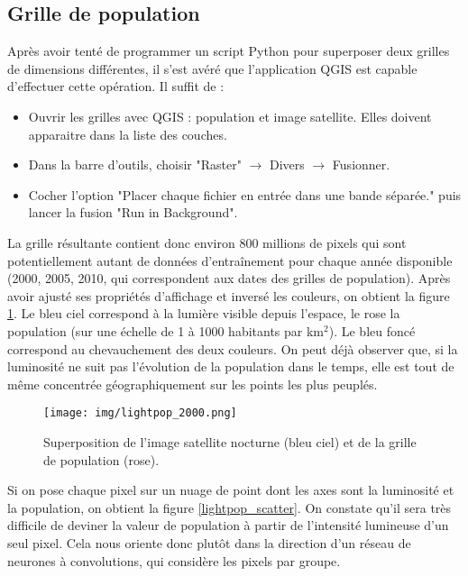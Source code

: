 \documentclass[a4paper, 11pt]{report}
\begin{document}
\subsection{Grille de population}

Après avoir tenté de programmer un script Python pour superposer deux grilles de dimensions différentes, il s'est avéré que l'application QGIS est capable d'effectuer cette opération. Il suffit de :

\begin{itemize}
	\item Ouvrir les grilles avec QGIS : population et image satellite. Elles doivent apparaitre dans la liste des couches.
	\item Dans la barre d'outils, choisir "Raster" $\rightarrow$ Divers $\rightarrow$ Fusionner.
	\item Cocher l'option "Placer chaque fichier en entrée dans une bande séparée." puis lancer la fusion "Run in Background".
\end{itemize}

La grille résultante contient donc environ 800 millions de pixels qui sont potentiellement autant de données d'entraînement pour chaque année disponible (2000, 2005, 2010, qui correspondent aux dates des grilles de population). Après avoir ajusté ses propriétés d'affichage et inversé les couleurs, on obtient la figure \ref{lightpop_2000}. Le bleu ciel correspond à la lumière visible depuis l'espace, le rose la population (sur une échelle de 1 à 1000 habitants par km$^2$). Le bleu foncé correspond au chevauchement des deux couleurs. On peut déjà observer que, si la luminosité ne suit pas l'évolution de la population dans le temps, elle est tout de même concentrée géographiquement sur les points les plus peuplés.

\begin{figure}
	\centering
	\texttt{[image: img/lightpop\_2000.png]}
	\caption{Superposition de l'image satellite nocturne (bleu ciel) et de la grille de population (rose).}
	\label{lightpop_2000}
\end{figure}

Si on pose chaque pixel sur un nuage de point dont les axes sont la luminosité et la population, on obtient la figure \ref{lightpop_scatter}. On constate qu'il sera très difficile de deviner la valeur de population à partir de l'intensité lumineuse d'un seul pixel. Cela nous oriente donc plutôt dans la direction d'un réseau de neurones à convolutions, qui considère les pixels par groupe.
\end{document}

